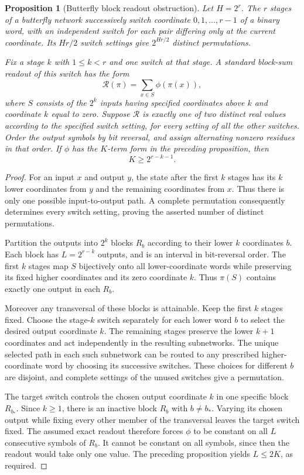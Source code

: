 \documentclass[11pt]{article}
\newtheorem{proposition}{Proposition}
\begin{document}
\begin{proposition}[Butterfly block readout obstruction]
Let $H=2^r$. The $r$ stages of a butterfly network successively switch
coordinate $0,1,\ldots,r-1$ of a binary word, with an independent switch
for each pair differing only at the current coordinate. Its
$Hr/2$ switch settings give $2^{Hr/2}$ distinct permutations.

Fix a stage $k$ with $1\leq k<r$ and one switch at that stage. A
standard block-sum readout of this switch has the form
\[
 \mathcal R(\pi)=\sum_{x\in S}\phi(\pi(x)),
\]
where $S$ consists of the $2^k$ inputs having specified coordinates
above $k$ and coordinate $k$ equal to zero. Suppose $\mathcal R$ is
exactly one of two distinct real values according to the specified
switch setting, for every setting of all the other switches. Order
the output symbols by bit reversal, and assign alternating nonzero
residues in that order. If $\phi$ has the $K$-term form in the preceding
proposition, then
\[
 K\geq 2^{r-k-1}.
\]
\end{proposition}
\begin{proof}
For an input $x$ and output $y$, the state after the first $k$ stages
has its $k$ lower coordinates from $y$ and the remaining coordinates
from $x$. Thus there is only one possible input-to-output path.
A complete permutation consequently determines every switch setting,
proving the asserted number of distinct permutations.

Partition the outputs into $2^k$ blocks $R_b$ according to their lower
$k$ coordinates $b$. Each block has $L=2^{r-k}$ outputs, and is an
interval in bit-reversal order. The first $k$ stages map $S$ bijectively
onto all lower-coordinate words while preserving its fixed higher
coordinates and its zero coordinate $k$. Thus $\pi(S)$ contains
exactly one output in each $R_b$.

Moreover any transversal of these blocks is attainable. Keep the first
$k$ stages fixed. Choose the stage-$k$ switch separately for each lower
word $b$ to select the desired output coordinate $k$. The remaining
stages preserve the lower $k+1$ coordinates and act independently in
the resulting subnetworks. The unique selected path in each such
subnetwork can be routed to any prescribed higher-coordinate word by
choosing its successive switches. These choices for different $b$
are disjoint, and complete settings of the unused switches give a
permutation.

The target switch controls the chosen output coordinate $k$ in one
specific block $R_{b_*}$. Since $k\geq1$, there is an inactive block
$R_b$ with $b\ne b_*$. Varying its chosen output while fixing every
other member of the transversal leaves the target switch fixed.
The assumed exact readout therefore forces $\phi$ to be constant on
all $L$ consecutive symbols of $R_b$. It cannot be constant on all
symbols, since then the readout would take only one value. The preceding
proposition yields $L\leq2K$, as required.
\end{proof}
\end{document}

